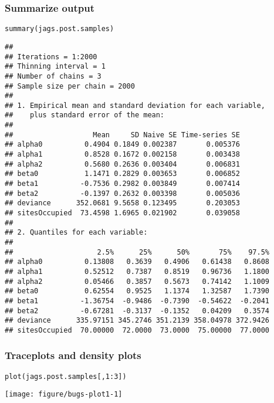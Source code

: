 \documentclass[color=usenames,dvipsnames]{beamer}\usepackage[]{graphicx}\usepackage[]{color}
\makeatletter
\newcommand{\hlnum}[1]{\textcolor[rgb]{0.69,0.494,0}{#1}}%
\newcommand{\hlopt}[1]{\textcolor[rgb]{0,0,0}{#1}}%
\newcommand{\hlstd}[1]{\textcolor[rgb]{0,0,0}{#1}}%
\newcommand{\hlkwd}[1]{\textcolor[rgb]{0.004,0.004,0.506}{#1}}%
\newenvironment{kframe}{%
 \def\at@end@of@kframe{}%
 \ifinner\ifhmode%
  \def\at@end@of@kframe{\end{minipage}}%
  \begin{minipage}{\columnwidth}%
 \fi\fi%
 \def\FrameCommand##1{\hskip\@totalleftmargin \hskip-\fboxsep
 \colorbox{shadecolor}{##1}\hskip-\fboxsep
     \hskip-\linewidth \hskip-\@totalleftmargin \hskip\columnwidth}%
 \MakeFramed {\advance\hsize-\width
   \@totalleftmargin\z@ \linewidth\hsize
   \@setminipage}}%
 {\par\unskip\endMakeFramed%
 \at@end@of@kframe}
\newenvironment{knitrout}{}{} %
\makeatother
\begin{document}
\begin{frame}[fragile]
  \frametitle{Summarize output}
\begin{knitrout}\tiny
{}\color{fgcolor}\begin{kframe}
\begin{alltt}
\hlkwd{summary}\hlstd{(jags.post.samples)}
\end{alltt}
\begin{verbatim}
## 
## Iterations = 1:2000
## Thinning interval = 1 
## Number of chains = 3 
## Sample size per chain = 2000 
## 
## 1. Empirical mean and standard deviation for each variable,
##    plus standard error of the mean:
## 
##                   Mean     SD Naive SE Time-series SE
## alpha0          0.4904 0.1849 0.002387       0.005376
## alpha1          0.8528 0.1672 0.002158       0.003438
## alpha2          0.5680 0.2636 0.003404       0.006831
## beta0           1.1471 0.2829 0.003653       0.006852
## beta1          -0.7536 0.2982 0.003849       0.007414
## beta2          -0.1397 0.2632 0.003398       0.005036
## deviance      352.0681 9.5658 0.123495       0.203053
## sitesOccupied  73.4598 1.6965 0.021902       0.039058
## 
## 2. Quantiles for each variable:
## 
##                    2.5%      25%      50%       75%    97.5%
## alpha0          0.13808   0.3639   0.4906   0.61438   0.8608
## alpha1          0.52512   0.7387   0.8519   0.96736   1.1800
## alpha2          0.05466   0.3857   0.5673   0.74142   1.1009
## beta0           0.62554   0.9525   1.1374   1.32587   1.7390
## beta1          -1.36754  -0.9486  -0.7390  -0.54622  -0.2041
## beta2          -0.67281  -0.3137  -0.1352   0.04209   0.3574
## deviance      335.97151 345.2746 351.2139 358.04978 372.9426
## sitesOccupied  70.00000  72.0000  73.0000  75.00000  77.0000
\end{verbatim}
\end{kframe}
\end{knitrout}
\end{frame}




\begin{frame}[fragile]
  \frametitle{Traceplots and density plots}
\begin{knitrout}\footnotesize
{}\color{fgcolor}\begin{kframe}
\begin{alltt}
\hlkwd{plot}\hlstd{(jags.post.samples[,}\hlnum{1}\hlopt{:}\hlnum{3}\hlstd{])}
\end{alltt}
\end{kframe}

{\centering \texttt{[image: figure/bugs-plot1-1]} 

}



\end{knitrout}
\end{frame}
\end{document}
